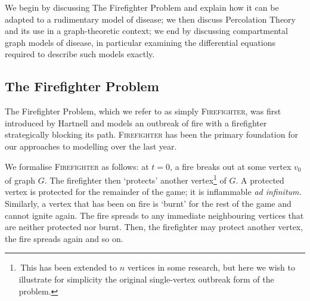 \documentclass[../report.tex]{subfiles}
\begin{document}
We begin by discussing The Firefighter Problem and explain how it can be adapted to a rudimentary model of disease; we then discuss Percolation Theory and its use in a graph-theoretic context; we end by discussing compartmental graph models of disease, in particular examining the differential equations required to describe such models exactly.

\subsection{The Firefighter Problem}

The Firefighter Problem, which we refer to as simply {\scshape Firefighter}, was first introduced by Hartnell \cite{hartnell_1995} and models an outbreak of fire with a firefighter strategically blocking its path. {\scshape Firefighter} has been the primary foundation for our approaches to modelling over the last year.

We formalise {\scshape Firefighter} as follows: at $t=0$, a fire breaks out at some vertex $v_0$ of graph $G$. The firefighter then `protects' another vertex\footnote{\,This has been extended to $n$ vertices in some research, but here we wish to illustrate for simplicity the original single-vertex outbreak form of the problem.} of $G$. A protected vertex is protected for the remainder of the game; it is inflammable \textit{ad infinitum.} Similarly, a vertex that has been on fire is `burnt' for the rest of the game and cannot ignite again. The fire spreads to any immediate neighbouring vertices that are neither protected nor burnt. Then, the firefighter may protect another vertex, the fire spreads again and so on. 
%
\end{document}
